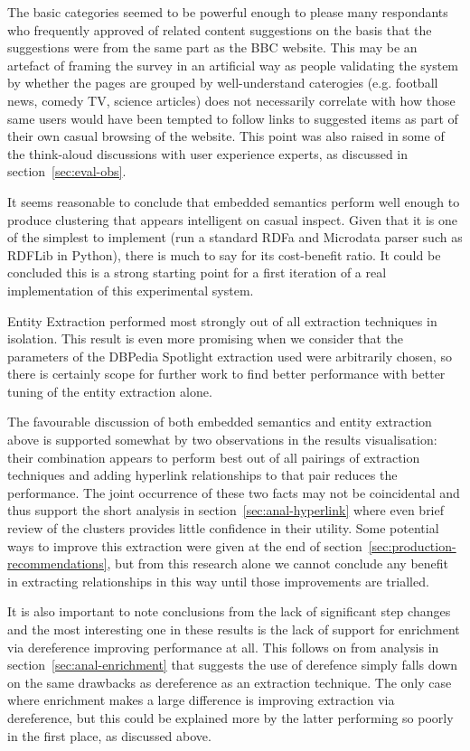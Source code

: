 The basic categories seemed to be powerful enough to please many
respondants who frequently approved of related content suggestions on
the basis that the suggestions were from the same part as the BBC
website. This may be an artefact of framing the survey in an
artificial way as people validating the system by whether the pages
are grouped by well-understand caterogies (e.g. football news, comedy
TV, science articles) does not necessarily correlate with how those
same users would have been tempted to follow links to suggested items
as part of their own casual browsing of the website. This point
was also raised in some of the think-aloud discussions with user
experience experts, as discussed in section~\ref{sec:eval-obs}.

It seems reasonable to conclude that embedded semantics perform
well enough to produce clustering that appears intelligent on casual
inspect. Given that it is one of the simplest to implement (run
a standard RDFa and Microdata parser such as RDFLib in Python), there
is much to say for its cost-benefit ratio. It could be concluded this
is a strong starting point for a first iteration of a real implementation
of this experimental system.

Entity Extraction performed most strongly out of all extraction
techniques in isolation. This result is even more promising when we
consider that the parameters of the DBPedia Spotlight extraction used
were arbitrarily chosen, so there is certainly scope for further
work to find better performance with better tuning of the entity
extraction alone.

The favourable discussion of both embedded semantics and entity
extraction above is supported somewhat by two observations in the
results visualisation: their combination appears to perform best out
of all pairings of extraction techniques and adding hyperlink
relationships to that pair reduces the performance. The joint
occurrence of these two facts may not be coincidental and thus
support the short analysis in section~\ref{sec:anal-hyperlink} where
even brief review of the clusters provides little confidence in their
utility. Some potential ways to improve this extraction were given
at the end of section~\ref{sec:production-recommendations}, but from
this research alone we cannot conclude any benefit in extracting
relationships in this way until those improvements are trialled.

It is also important to note conclusions from the lack of significant
step changes and the most interesting one in these results is the lack
of support for enrichment via dereference improving performance at
all. This follows on from analysis in section~\ref{sec:anal-enrichment}
that suggests the use of derefence simply falls down on the same
drawbacks as dereference as an extraction technique. The only case
where enrichment makes a large difference is improving extraction via
dereference, but this could be explained more by the latter performing
so poorly in the first place, as discussed above.

